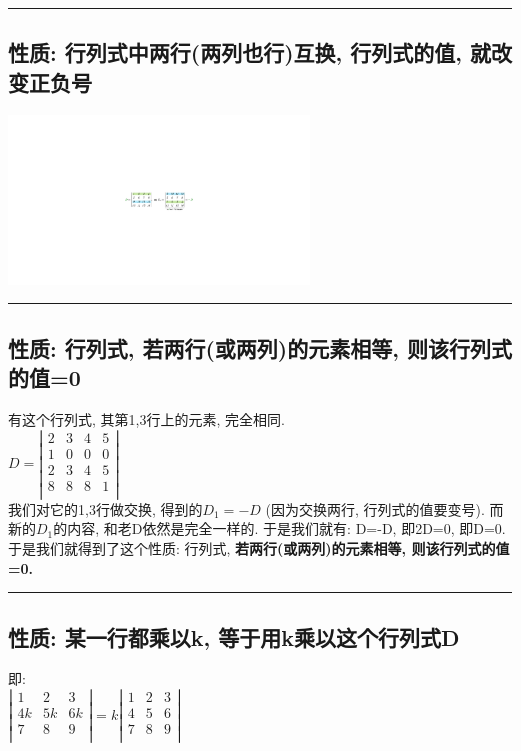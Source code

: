 \documentclass[UTF8]{ctexart}
\begin{document}
\hrule
	
	\subsection{性质: 行列式中两行(两列也行)互换, 行列式的值, 就改变正负号 }
	
	\includegraphics[width=0.6\textwidth]{img/0008.pdf}\\
	
	\hrule
	
	\subsection{性质: 行列式, 若两行(或两列)的元素相等, 则该行列式的值=0}
	
	有这个行列式, 其第1,3行上的元素, 完全相同. \\
	$
	D=\left| \begin{matrix}
		2&		3&		4&		5\\
		1&		0&		0&		0\\
		2&		3&		4&		5\\
		8&		8&		8&		1\\
	\end{matrix} \right|
	$ \\
	
	我们对它的1,3行做交换, 得到的$D_1 = -D$ (因为交换两行, 行列式的值要变号). 而新的$D_1$的内容, 和老D依然是完全一样的. 于是我们就有: D=-D, 即2D=0, 即D=0. \\	
	于是我们就得到了这个性质: 行列式, \textbf{若两行(或两列)的元素相等, 则该行列式的值=0.}\\
	
	\hrule
	
	\subsection{性质: 某一行都乘以k, 等于用k乘以这个行列式D }
	即:\\
	$
	\left| \begin{matrix}
		1&		2&		3\\
		4k&		5k&		6k\\
		7&		8&		9\\
	\end{matrix} \right|=k\left| \begin{matrix}
		1&		2&		3\\
		4&		5&		6\\
		7&		8&		9\\
	\end{matrix} \right|
	$\\
	
\end{document}
